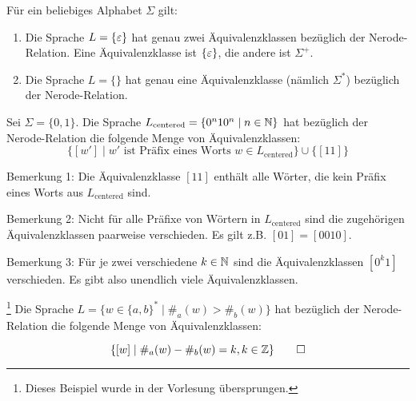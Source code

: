 \begin{Bsp}
      Für ein beliebiges Alphabet $\Sigma$ gilt:
      \begin{enumerate}
       \item Die Sprache $L=\{\varepsilon\}$ hat genau zwei Äquivalenzklassen bezüglich der Nerode-Relation.
      Eine Äquivalenzklasse ist $\{\varepsilon\}$, die andere ist $\Sigma^+$.
       \item Die Sprache $L=\{\}$ hat genau eine Äquivalenzklasse (nämlich $\Sigma^*$) bezüglich der Nerode-Relation.
       \qedhere
      \end{enumerate}
\end{Bsp}

\begin{Bsp}\label{bsp:2.centeredMyhillNerode}
Sei $\Sigma=\{0,1\}$. Die Sprache $L_\text{centered}=\{0^n10^n \mid n\in\mathbb{N}\}$ hat bezüglich der Nerode-Relation die folgende Menge von Äquivalenzklassen:
$$\{ [w'] \mid w' \text{ ist Präfix eines Worts } w\in L_\text{centered}\} \cup \{ [11] \}$$

Bemerkung 1: Die Äquivalenzklasse $[11]$ enthält alle Wörter, die kein Präfix eines Worts aus $L_\text{centered}$ sind.

Bemerkung 2: Nicht für alle Präfixe von Wörtern in $L_\text{centered}$ sind die zugehörigen Äquivalenzklassen paarweise verschieden. Es gilt z.B. $[01]=[0010]$.

Bemerkung 3: Für je zwei verschiedene $k\in\mathbb{N}$ sind die Äquivalenzklassen $[0^k1]$ verschieden. Es gibt also unendlich viele Äquivalenzklassen.
\end{Bsp}

{\color{violet}
\begin{Bsp*}\footnote{Dieses Beispiel wurde in der Vorlesung übersprungen.}
 Die Sprache $L=\{w \in \{a,b\}^* \mid \#_a(w) > \#_b(w)\}$ hat bezüglich der Nerode-Relation die folgende Menge von Äquivalenzklassen:%

 \[
 \{ [w] \mid  \#_a(w) - \#_b(w)=k, k\in\mathbb{Z} \}
 \qedhere
 \]
\end{Bsp*}
}



